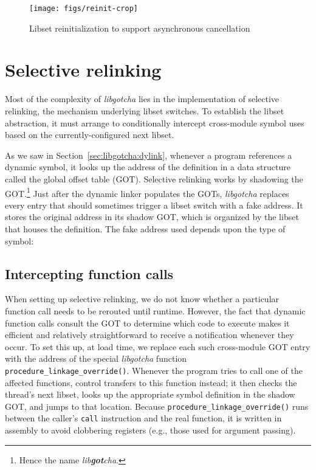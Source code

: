 \begin{figure}
\texttt{[image: figs/reinit-crop]}
\caption{Libset reinitialization to support asynchronous cancellation}
\label{fig:reinit}
\end{figure}


\section{Selective relinking}

Most of the complexity of \textit{libgotcha} lies in the implementation of selective
relinking, the mechanism underlying libset switches.  To establish the libset
abstraction, it must arrange to conditionally intercept cross-module symbol
uses based on the currently-configured next libset.

As we saw in Section~\ref{sec:libgotcha:dylink}, whenever a program references a
dynamic symbol, it looks up the address of the definition in a data structure called
the global offset table (GOT).  Selective relinking works by shadowing the
GOT.\footnote{Hence the name \textit{lib\textbf{got}cha}.}  Just after the dynamic
linker populates the GOTs, \textit{libgotcha} replaces every entry that should
sometimes trigger a libset switch with a fake address.  It stores the original
address in its shadow GOT, which is organized by the libset that houses the
definition.  The fake address used depends upon the type of symbol:


\subsection{Intercepting function calls}

When setting up selective relinking, we do not know whether a particular function
call needs to be rerouted until runtime.  However, the fact that dynamic function
calls consult the GOT to determine which code to execute makes it efficient and
relatively straightforward to receive a notification whenever they occur.  To set
this up, at load time, we replace each such cross-module GOT entry with the address
of the special \textit{libgotcha} function \texttt{procedure\_linkage\_override()}.
Whenever the program tries to call one of the affected functions, control transfers
to this function instead; it then checks the thread's next libset, looks up the
appropriate symbol definition in the shadow GOT, and jumps to that location.  Because
\texttt{procedure\_linkage\_override()} runs between the caller's \texttt{call}
instruction and the real function, it is written in assembly to avoid clobbering
registers (e.g., those used for argument passing).

